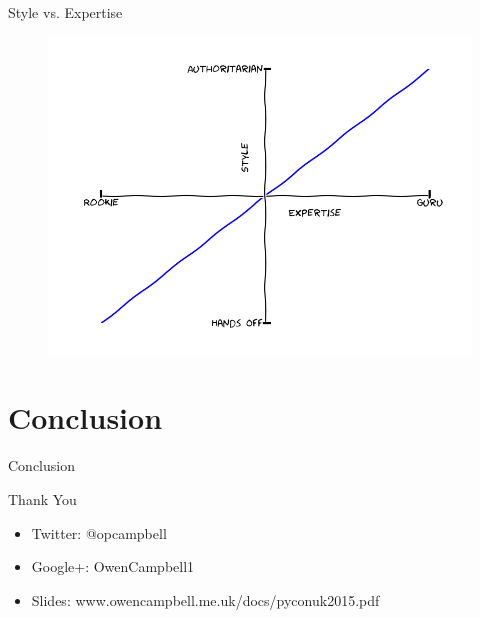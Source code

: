 \documentclass{beamer}
\begin{document}
    \begin{frame}{Style vs. Expertise}
      \begin{figure}
          \includegraphics[scale=0.5]{images/style}
        \end{figure}
    \end{frame}

  \section{Conclusion}

    \begin{frame}{Conclusion}
    \end{frame}

    \begin{frame}{Thank You}
      \begin{itemize}
        \item Twitter: @opcampbell
        \item Google+: OwenCampbell1
        \item Slides: www.owencampbell.me.uk/docs/pyconuk2015.pdf
      \end{itemize}
    \end{frame}
\end{document}
